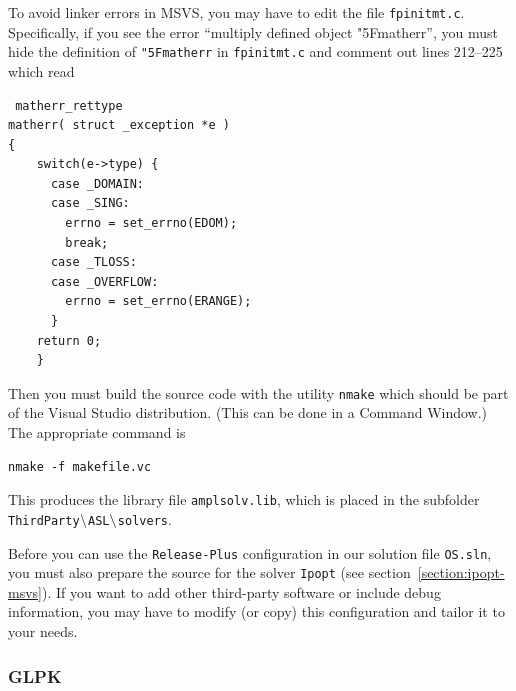 \documentclass[11pt]{article}
\renewcommand{\_}{{\char"5F}}
\renewcommand{\{}{{\char"7B}}
\renewcommand{\}}{{\char"7D}}
\renewcommand{\^}{{\char"0D}}
\renewcommand{\'}{{\char"0D}}
\newif\ifipopt  \ipopttrue      %
\begin{document}
To avoid linker errors in MSVS, you may have to edit the file {\tt fpinitmt.c}.
Specifically, if you see the error ``multiply defined object \_matherr'', you must
hide the definition of {\tt \_matherr} in {\tt fpinitmt.c} and comment out lines 212--225
which read
\begin{verbatim}
 matherr_rettype
matherr( struct _exception *e )
{
	switch(e->type) {
	  case _DOMAIN:
	  case _SING:
		errno = set_errno(EDOM);
		break;
	  case _TLOSS:
	  case _OVERFLOW:
		errno = set_errno(ERANGE);
	  }
	return 0;
	}
\end{verbatim}

Then you must build the source code with the utility {\tt nmake}
which should be part of the Visual Studio distribution. (This can be done in a Command Window.)
The appropriate command is
\begin{verbatim}
nmake -f makefile.vc
\end{verbatim}
This produces the library file {\tt amplsolv.lib}, which is placed in the subfolder
{\tt ThirdParty$\tt\backslash$ASL$\tt\backslash$solvers}.

        
\ifipopt
Before you can use the {\tt Release-Plus} 
configuration in our solution file {\tt OS.sln},
you must also prepare the source for the solver {\tt Ipopt}
(see section~\ref{section:ipopt-msvs}). If you want to add other third-party software or include debug information,
you may have to modify (or copy) this configuration and tailor it to your needs.
\else
Now you are ready to use MSVS. Both the {\tt Debug}\index{Microsoft Visual Studio!{\tt Debug} configuration} and 
{\tt Release}\index{Microsoft Visual Studio!{\tt Release} configuration} configurations contain two projects, 
{\tt libOSnl2OSiL} and {\tt OSAmplClient}, which use the ASL library and are normally deactivated. 
Activate these projects in the Configuration Manager\index{Microsoft Visual Studio!Configuration Manager} 
(available from the Build menu), then select Build.
\fi
\fi
{}

\subsubsection{GLPK}
\end{document}
